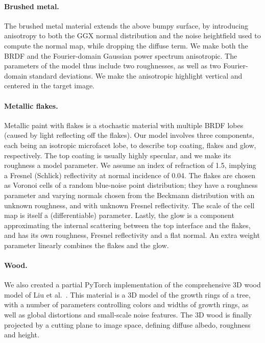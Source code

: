 \paragraph{Brushed metal.} The brushed metal material extends the above bumpy surface, by introducing anisotropy to both the GGX normal distribution and the noise heightfield used to compute the normal map, while dropping the diffuse term. We make both the BRDF and the Fourier-domain Gaussian power spectrum anisotropic. The parameters of the model thus include two roughnesses, as well as two Fourier-domain standard deviations.  We make the anisotropic highlight vertical and centered in the target image.

\paragraph{Metallic flakes.} Metallic paint with flakes is a stochastic material with multiple BRDF lobes (caused by light reflecting off the flakes). Our model involves three components, each being an isotropic microfacet lobe, to describe top coating, flakes and glow, respectively. The top coating is usually highly specular, and we make its roughness a model parameter. We assume an index of refraction of 1.5, implying a Fresnel (Schlick) reflectivity at normal incidence of 0.04. The flakes are chosen as Voronoi cells of a random blue-noise point distribution; they have a roughness parameter and varying normals chosen from the Beckmann distribution with an unknown roughness, and with unknown Fresnel reflectivity. The scale of the cell map is itself a (differentiable) parameter. Lastly, the glow is a component approximating the internal scattering between the top interface and the flakes, and has its own roughness, Fresnel reflectivity and a flat normal. An extra weight parameter linearly combines the flakes and the glow.

\paragraph{Wood.} We also created a partial \textsf{PyTorch} implementation of the comprehensive 3D wood model of Liu et al.~\cite{liu2016simulating}. This material is a 3D model of the growth rings of a tree, with a number of parameters controlling colors and widths of growth rings, as well as global distortions and small-scale noise features. The 3D wood is finally projected by a cutting plane to image space, defining diffuse albedo, roughness and height.


